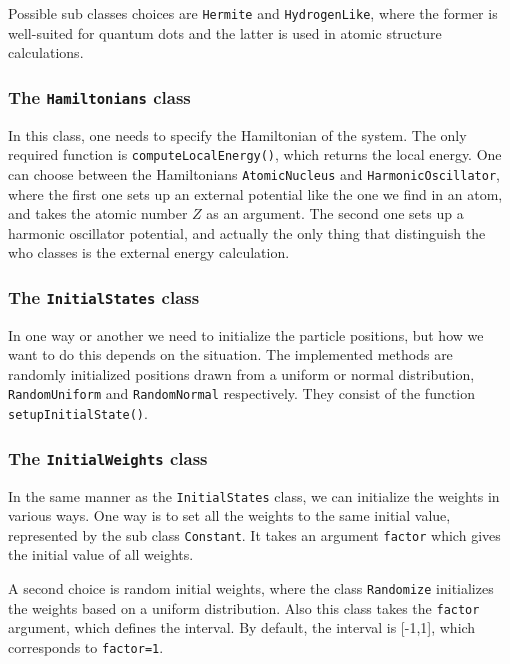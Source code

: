 Possible sub classes choices are \lstinline{Hermite} and \lstinline{HydrogenLike}, where the former is well-suited for quantum dots and the latter is used in atomic structure calculations. 

\subsubsection{The \lstinline{Hamiltonians} class}
In this class, one needs to specify the Hamiltonian of the system. The only required function is \lstinline{computeLocalEnergy()}, which returns the local energy. One can choose between the Hamiltonians \lstinline{AtomicNucleus} and \lstinline{HarmonicOscillator}, where the first one sets up an external potential like the one we find in an atom, and takes the atomic number $Z$ as an argument. The second one sets up a harmonic oscillator potential, and actually the only thing that distinguish the who classes is the external energy calculation. 

\subsubsection{The \lstinline{InitialStates} class}
In one way or another we need to initialize the particle positions, but how we want to do this depends on the situation. The implemented methods are randomly initialized positions drawn from a uniform or normal distribution, \lstinline{RandomUniform} and \lstinline{RandomNormal} respectively. They consist of the function \lstinline{setupInitialState()}.

\subsubsection{The \lstinline{InitialWeights} class}
In the same manner as the \lstinline{InitialStates} class, we can initialize the weights in various ways. One way is to set all the weights to the same initial value, represented by the sub class \lstinline{Constant}. It takes an argument \lstinline{factor} which gives the initial value of all weights.

A second choice is random initial weights, where the class \lstinline{Randomize} initializes the weights based on a uniform distribution. Also this class takes the \lstinline{factor} argument, which defines the interval. By default, the interval is [-1,1], which corresponds to \lstinline{factor=1}.

